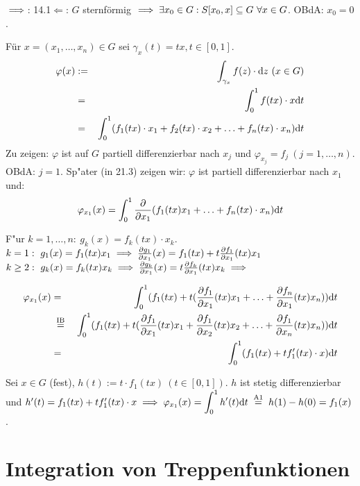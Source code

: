 \documentclass[a4paper,twoside,DIV15,BCOR12mm]{scrbook}
\begin{document}
\begin{beweis}
\glqq$\implies$\grqq: 14.1\quad \glqq$\Leftarrow$\grqq: $G$ sternförmig $\implies\exists x_0\in G:S[x_0,x]\subseteq G\ \forall x\in G$. OBdA: $x_0=0$. 

Für $x=(x_1,\ldots,x_n)\in G$ sei $\gamma_x(t)=tx, t\in [0,1]$.
\begin{eqnarray*}
\varphi(x)&:=&\int_{\gamma_x}f(z)\cdot\text{d}z\ (x\in G)\\
&=&\displaystyle\int_0^1 f(tx)\cdot x\text{d}t\\
&=&\displaystyle\int_0^1(f_1(tx)\cdot x_1+f_2(tx)\cdot x_2+\ldots+f_n(tx)\cdot x_n)\text{d}t\\
\end{eqnarray*}
Zu zeigen: $\varphi$ ist auf $G$ partiell differenzierbar nach $x_j$ und $\varphi_{x_j}=f_j\ (j=1,\ldots,n)$.
OBdA: $j=1$. Sp"ater (in 21.3) zeigen wir: $\varphi$ ist partiell differenzierbar nach $x_1$ und:
$$\varphi_{x_1}(x)=\displaystyle\int_0^1\frac{\partial}{\partial x_1}(f_1(tx)x_1+\ldots+f_n(tx)\cdot x_n)\text{d}t$$

F"ur $k=1,\ldots,n:\ g_k(x)=f_k(tx)\cdot x_k$.\\
$k=1:\ g_1(x)=f_1(tx)x_1\implies\frac{\partial g_1}{\partial x_1}(x)=f_1(tx)+t\frac{\partial f_1}{\partial x_1}(tx)x_1$\\
$k\ge 2:\ g_k(x)=f_k(tx)x_k\folgt\frac{\partial g_k}{\partial x_1}(x)=t\frac{\partial f_k}{\partial x_1}(tx)x_k\folgt$

\begin{eqnarray*}
\varphi_{x_1}(x)&=&\int_0^1(f_1(tx)+t(\frac{\partial f_1}{\partial x_1}(tx)x_1+\ldots+\frac{\partial f_n}{\partial x_1}(tx)x_n))\text{d}t\\
&\gleichnach{IB}&\int_0^1(f_1(tx)+t(\frac{\partial f_1}{\partial x_1}(tx)x_1+\frac{\partial f_1}{\partial x_2}(tx)x_2+\ldots+\frac{\partial f_1}{\partial x_n}(tx)x_n))\text{d}t\\
&=&\ds\int_0^1(f_1(tx)+tf_1'(tx)\cdot x)\text{d}t
\end{eqnarray*}

Sei $x\in G$ (fest), $h(t):=t\cdot f_1(tx)\ (t\in [0,1])$. $h$ ist stetig differenzierbar und $h'(t)=f_1(tx)+tf_1'(tx)\cdot x\folgt \varphi_{x_1}(x)=\ds\int_0^1 h'(t)\text{d}t\gleichnach{A1}h(1)-h(0)=f_1(x)$.
\end{beweis}

\chapter{Integration von Treppenfunktionen}
\end{document}
